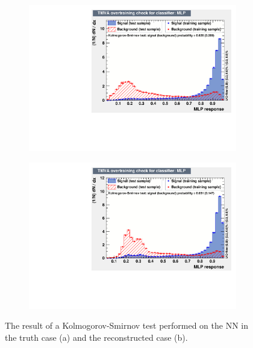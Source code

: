 \documentclass[10pt,a4paper]{book}
\begin{document}
\begin{figure}[h]
\begin{subfigure}{1.0\textwidth}
\centering
\includegraphics[scale=0.7]{ch4_images/MLP_overtraining_truth.pdf}
\caption{}
\end{subfigure}
\begin{subfigure}{1.0\textwidth}
\centering
\includegraphics[scale=0.7]{ch4_images/MLP_overtraining_reco.pdf}
\caption{}
\end{subfigure}
\caption{The result of a Kolmogorov-Smirnov test performed on the NN in the truth case (a) and the reconstructed case (b).}
\label{kolmogorov smirnov mlp}
\end{figure} 
\end{document}
